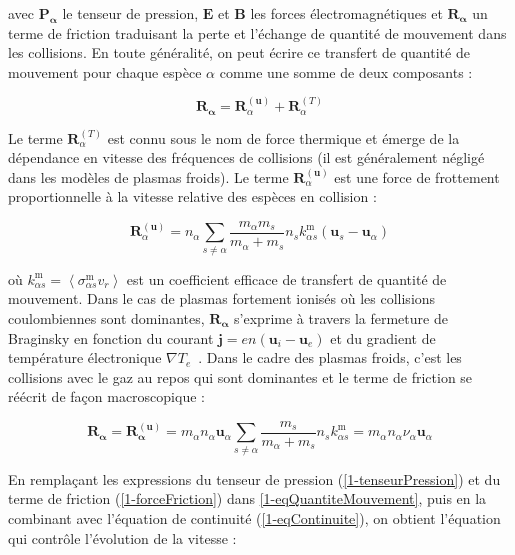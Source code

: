 \begin{refsection}
avec $\mathbf{P_\alpha}$ le tenseur de pression, $\mathbf{E}$ et $\mathbf{B}$
les forces électromagnétiques et $\mathbf{R_\alpha}$ un terme de
friction traduisant la perte et l'échange de quantité de mouvement dans les
collisions. En toute généralité, on peut écrire ce transfert de quantité de
mouvement pour chaque espèce $\alpha$ comme une somme de deux composants :

\begin{equation}
\mathbf{R_\alpha}=\mathbf{R}_{\alpha}^{(\mathbf
u)}+\mathbf{R}_{\alpha}^{(T)}
\end{equation}

Le terme
$\mathbf{R}_{\alpha}^{(T)}$ est connu sous le nom de force thermique et
émerge de la dépendance en vitesse des fréquences de collisions (il est
généralement négligé dans les modèles de plasmas froids).
Le terme $\mathbf{R}_{\alpha}^{(\mathbf u)}$ est une force de frottement
proportionnelle à la vitesse relative des espèces en collision :

\begin{equation}
\mathbf{R}_{\alpha}^{(\mathbf
u)}=n_\alpha\sum_{s\neq\alpha}\frac{m_\alpha m_s}{m_\alpha+m_s}
n_sk^\text{m}_{\alpha s} \left(\mathbf u_s-\mathbf u_\alpha\right)
\end{equation}

où $k^\text{m}_{\alpha s}=\left<\sigma^\text{m}_{\alpha s}v_r\right>$ est un
coefficient efficace de transfert de quantité de mouvement.
Dans le cas de plasmas fortement ionisés où les collisions coulombiennes sont
dominantes, $\mathbf{R_\alpha}$ s'exprime à travers la fermeture de
Braginsky en fonction du courant $\mathbf
j=en\left(\mathbf u_i-\mathbf u_e\right)$ et du gradient de température
électronique $\nabla T_e$~\parencite{Braginsky}. Dans le cadre des plasmas
froids, c'est les collisions avec le gaz au repos qui sont dominantes et le
terme de friction se réécrit de façon macroscopique :

\begin{equation}
\label{1-forceFriction}
\mathbf{R_{\alpha}}=\mathbf{R_{\alpha}^{(\mathbf
u)}}=m_\alpha n_\alpha\mathbf u_\alpha\sum_{s\neq\alpha}\frac{m_s}{m_\alpha+m_s}
n_sk^\text{m}_{\alpha s} = m_\alpha n_\alpha \nu_\alpha \mathbf u_\alpha
\end{equation}

En remplaçant les expressions du
tenseur de pression (\eqref{1-tenseurPression}) et du terme de friction (\eqref{1-forceFriction}) dans
\eqref{1-eqQuantiteMouvement}, puis en la combinant avec l'équation de
continuité (\eqref{1-eqContinuite}), on obtient l'équation qui contrôle
l'évolution de la vitesse :


\end{refsection}

